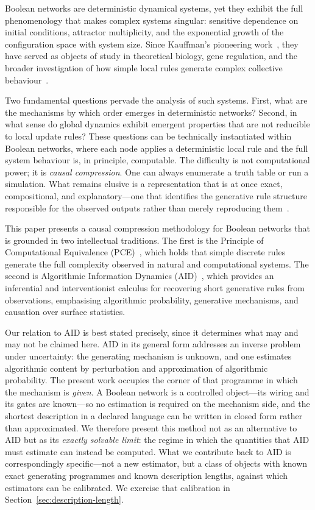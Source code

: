 \documentclass[11pt]{article}
\begin{document}
Boolean networks are deterministic dynamical systems,
yet they exhibit the full phenomenology that makes complex systems
singular: sensitive dependence on initial conditions,
attractor multiplicity, and the exponential growth of the configuration
space with system size.  Since Kauffman's pioneering
work~\cite{kauffman}, they have served as objects of study in
theoretical biology, gene regulation, and the broader investigation of
how simple local rules generate complex collective
behaviour~\cite{wolfram2002new}.

Two fundamental questions pervade the analysis of such systems. First, 
what are the mechanisms by which order emerges in deterministic networks? 
Second, in what sense do global dynamics exhibit emergent properties that 
are not reducible to local update rules? These questions can be 
technically instantiated within Boolean networks, where each node 
applies a deterministic local rule and the full system behaviour is, 
in principle, computable. The difficulty is not computational power; 
it is \emph{causal compression}. One can always enumerate a truth table 
or run a simulation. What remains elusive is a representation that is at 
once exact, compositional, and explanatory---one that identifies the 
generative rule structure responsible for the observed outputs rather 
than merely reproducing 
them~\cite{kauffman1993origins,wolfram2002new,clarke2019compositional,li2011dynamics}.

This paper presents a causal compression methodology for Boolean networks
that is grounded in two intellectual traditions.  The first is the
Principle of Computational Equivalence (PCE)~\cite{wolfram2002new}, which
holds that simple discrete rules generate the full complexity observed in
natural and computational systems.  The second is Algorithmic Information
Dynamics (AID)~\cite{zenilcalculus,zenildeconv,zenilaidbook}, which provides an
inferential and interventionist calculus for recovering short generative
rules from observations, emphasising algorithmic probability, generative
mechanisms, and causation over surface statistics.

Our relation to AID is best stated precisely, since it determines what may
and may not be claimed here.  AID in its general form addresses an inverse
problem under uncertainty: the generating mechanism is unknown, and one
estimates algorithmic content by perturbation and approximation of
algorithmic probability.  The present work occupies the corner of that
programme in which the mechanism is \emph{given}.  A Boolean network is a
controlled object---its wiring and its gates are known---so no estimation
is required on the mechanism side, and the shortest description in a
declared language can be written in closed form rather than approximated.
We therefore present this method not as an alternative to AID but as its
\emph{exactly solvable limit}: the regime in which the quantities that AID
must estimate can instead be computed.  What we contribute back to AID is
correspondingly specific---not a new estimator, but a class of objects with
known exact generating programmes and known description lengths, against
which estimators can be calibrated.  We exercise that calibration in
Section~\ref{sec:description-length}.
\end{document}

